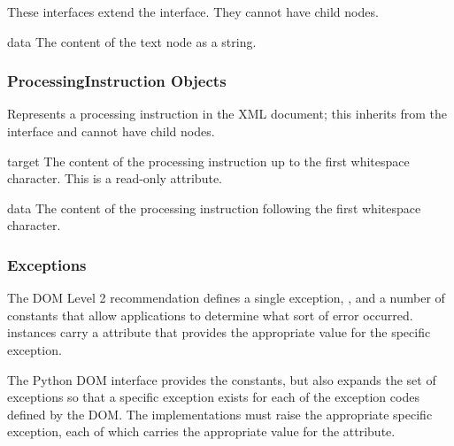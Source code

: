 These interfaces extend the  interface.  They cannot have
child nodes.

\begin{memberdesc}[Text]{data}
The content of the text node as a string.
\end{memberdesc}



\subsubsection{ProcessingInstruction Objects \label{dom-pi-objects}}

Represents a processing instruction in the XML document; this inherits
from the  interface and cannot have child nodes.

\begin{memberdesc}[ProcessingInstruction]{target}
The content of the processing instruction up to the first whitespace
character.  This is a read-only attribute.
\end{memberdesc}

\begin{memberdesc}[ProcessingInstruction]{data}
The content of the processing instruction following the first
whitespace character.
\end{memberdesc}


\subsubsection{Exceptions \label{dom-exceptions}}


The DOM Level 2 recommendation defines a single exception,
, and a number of constants that allow
applications to determine what sort of error occurred.
 instances carry a  attribute
that provides the appropriate value for the specific exception.

The Python DOM interface provides the constants, but also expands the
set of exceptions so that a specific exception exists for each of the
exception codes defined by the DOM.  The implementations must raise
the appropriate specific exception, each of which carries the
appropriate value for the  attribute.

